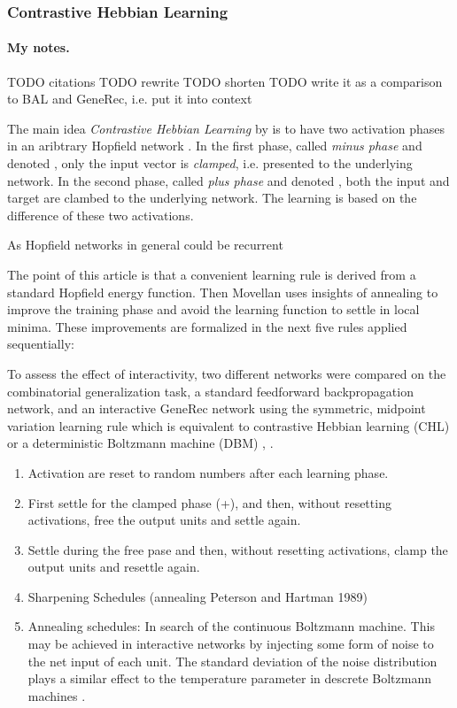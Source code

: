 \subsubsection{Contrastive Hebbian Learning}
\label{models-chl} 

\paragraph{My notes.}
TODO citations 
TODO rewrite 
TODO shorten 
TODO write it as a comparison to BAL and GeneRec, i.e. put it into context 

The main idea \emph{Contrastive Hebbian Learning} by \citet{movellan1990contrastive} is to have two activation phases in an aribtrary Hopfield network \citep{hopfield1984neurons}. In the first phase, called \emph{minus phase} and denoted \uv{-}, only the input vector is \emph{clamped}, i.e. presented to the underlying network. In the second phase, called \emph{plus phase} and denoted \uv{+}, both the input and target are clambed to the underlying network. The learning is based on the difference of these two activations. 

As Hopfield networks in general could be recurrent 

The point of this article \citet{movellan1990contrastive} is that a convenient learning rule is derived from a standard Hopfield energy function. Then Movellan uses insights of annealing to improve the training phase and avoid the learning function to settle in local minima. These improvements are formalized in the next five rules applied sequentially:

To assess the effect of interactivity, two different networks were compared on the combinatorial generalization task, a standard feedforward backpropagation network, and an interactive GeneRec network using the symmetric, midpoint variation learning rule which is equivalent to contrastive Hebbian learning (CHL) or a deterministic Boltzmann machine (DBM) \citet{o1996bio}, \citet{o2001generalization}. 

\begin{enumerate}
\item Activation are reset to random numbers after each learning phase. 

\item First settle for the clamped phase (+), and then, without resetting activations, free the output units and settle again. 

\item Settle during the free pase and then, without resetting activations, clamp the output units and resettle again. 

\item Sharpening Schedules (annealing Peterson and Hartman 1989)

\item Annealing schedules: In search of the continuous Boltzmann machine. This may be achieved in interactive networks by injecting some form of noise to the net input of each unit. The standard deviation of the noise distribution plays a similar effect to the temperature parameter in descrete Boltzmann machines \citet{movellan1990contrastive}. 
\end{enumerate}

